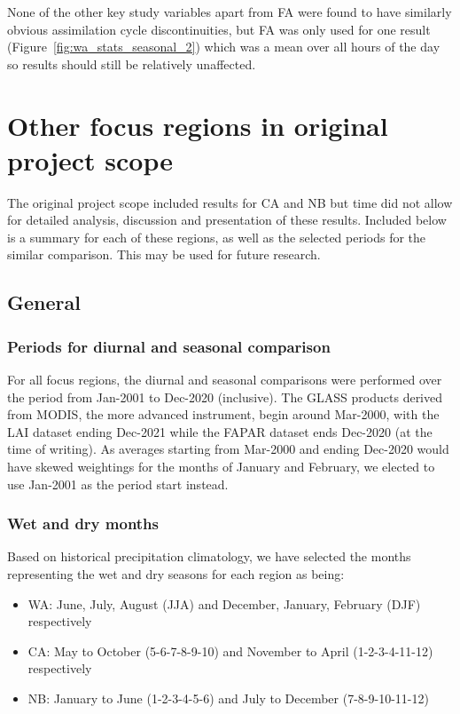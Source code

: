 None of the other key study variables apart from \ac{FA} were found to have similarly obvious assimilation cycle discontinuities, but \ac{FA} was only used for one result (Figure~\ref{fig:wa_stats_seasonal_2}) which was a mean over all hours of the day so results should still be relatively unaffected.

\section{Other focus regions in original project scope}
\label{sec:other_regions}

The original project scope included results for \ac{CA} and \ac{NB} but time did not allow for detailed analysis, discussion and presentation of these results. Included below is a summary for each of these regions, as well as the selected periods for the similar comparison. This may be used for future research.

\subsection{General}

\subsubsection{Periods for diurnal and seasonal comparison}

For all focus regions, the diurnal and seasonal comparisons were performed over the period from Jan-2001 to Dec-2020 (inclusive). The GLASS products derived from \ac{MODIS}, the more advanced instrument, begin around Mar-2000, with the \ac{LAI} dataset ending Dec-2021 while the \ac{FAPAR} dataset ends Dec-2020 (at the time of writing). As averages starting from Mar-2000 and ending Dec-2020 would have skewed weightings for the months of January and February, we elected to use Jan-2001 as the period start instead.

\subsubsection{Wet and dry months}

Based on historical precipitation climatology, we have selected the months representing the wet and dry seasons for each region as being:
\begin{itemize}
	\item \ac{WA}: June, July, August (JJA) and December, January, February (DJF) respectively
	\item \ac{CA}: May to October (5-6-7-8-9-10) and November to April (1-2-3-4-11-12) respectively
	\item \ac{NB}: January to June (1-2-3-4-5-6) and July to December (7-8-9-10-11-12)
\end{itemize}

